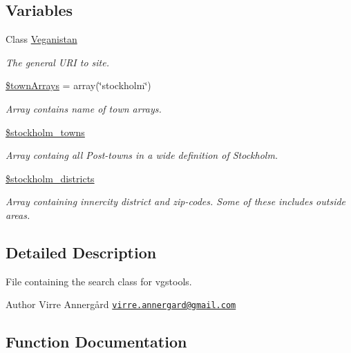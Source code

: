 \subsection*{Variables}
\begin{DoxyCompactItemize}
\item 
Class \hyperlink{veganistan_8php_ad195a0ca83dc2cfc81667f8b7e2c2e8f}{Veganistan}
\begin{DoxyCompactList}\small\item\em The general U\+RI to site. \end{DoxyCompactList}\item 
\hyperlink{veganistan_8php_a91710d77c3b1fe716933e6b2812ebb48}{\$town\+Arrays} = array(\char`\"{}stockholm\char`\"{})
\begin{DoxyCompactList}\small\item\em Array contains name of town arrays. \end{DoxyCompactList}\item 
\hyperlink{veganistan_8php_aa87fd4a07e43c737def4add38fe29880}{\$stockholm\+\_\+towns}
\begin{DoxyCompactList}\small\item\em Array containg all Post-\/towns in a wide definition of Stockholm. \end{DoxyCompactList}\item 
\hyperlink{veganistan_8php_afeef2fa6638c4bffe83af73ec7b4c5d6}{\$stockholm\+\_\+districts}
\begin{DoxyCompactList}\small\item\em Array containing innercity district and zip-\/codes. Some of these includes outside areas. \end{DoxyCompactList}\end{DoxyCompactItemize}


\subsection{Detailed Description}
File containing the search class for vgstools. 

\begin{DoxyAuthor}{Author}
Virre Annergård \href{mailto:virre.annergard@gmail.com}{\tt virre.\+annergard@gmail.\+com} 
\end{DoxyAuthor}


\subsection{Function Documentation}
\hypertarget{veganistan_8php_ab9d8d11d7c212098c40df90c702d02e0}{}\label{veganistan_8php_ab9d8d11d7c212098c40df90c702d02e0} 
